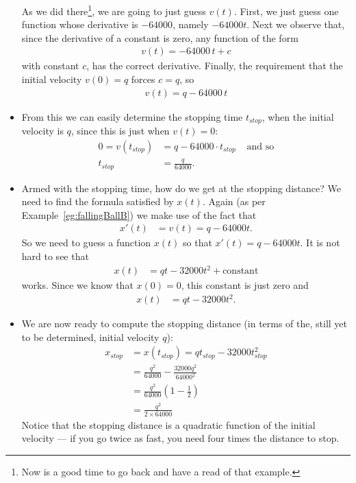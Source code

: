 \begin{eg}
\begin{itemize}
As we did there\footnote{Now is a good time to go back and have a read of that example.},
we are going to just guess $v(t)$. First, we just guess one function whose derivative is
$-64000$, namely $-64000 t$. Next we observe that, since the derivative of a constant is
zero, any function of the form
\begin{align*}
  v(t) = -64000\,t + c
\end{align*}
with constant $c$, has the correct derivative. Finally, the requirement that the initial
velocity $v(0)=q$ forces $c=q$, so
\begin{align*}
  v(t) = q - 64000\,t
\end{align*}

\item From this we can easily determine the stopping time $t_{stop}$, when the initial
velocity is $q$, since this is just when $v(t) = 0$:
\begin{align*}
  0 = v(t_{stop}) &= q-64000 \cdot t_{stop} & \text{ and so}\\
  t_{stop} &= \frac{q}{64000}.
\end{align*}
\item Armed with the stopping time, how do we get at the stopping distance?  We need to
find the formula satisfied by $x(t)$. Again (as per Example~\ref{eg:fallingBallB}) we
make use of the fact that
\begin{align*}
x'(t) &= v(t) = q - 64000t.
\end{align*}
So we need to guess a function $x(t)$ so that $x'(t) = q-64000 t$. It is not hard to see
that
\begin{align*}
  x(t) &= qt - 32000t^2 + \text{constant}
\end{align*}
works. Since we know that $x(0)=0$, this constant is just zero and
\begin{align*}
  x(t) &= qt - 32000 t^2.
\end{align*}

\item We are now ready to compute the stopping distance (in terms of the, still yet to be
determined, initial velocity $q$):
\begin{align*}
  x_{stop} &= x(t_{stop}) = q t_{stop} - 32000 t_{stop}^2 \\
  &= \frac{q^2}{64000} - \frac{32000 q^2}{64000^2} \\
  &= \frac{q^2}{64000} \left(1 - \frac{1}{2} \right) \\
  &= \frac{q^2}{2 \times 64000}
\end{align*}
Notice that the stopping distance is a quadratic function of the initial velocity --- if
you go twice as fast, you need four times the distance to stop.


\end{itemize}
\end{eg}
